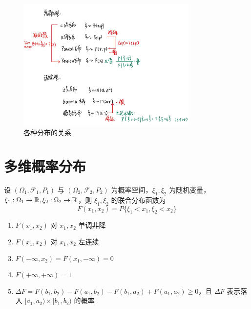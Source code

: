 \documentclass[12pt,a4paper]{amsart}
\begin{document}
\begin{figure}[htbp]
    \centering
    \includegraphics[width=0.8\textwidth]{./src/1.png}
    \caption{各种分布的关系}
    \label{fig:1}
\end{figure}

\section{多维概率分布}

\begin{definition}[联合分布函数]
    设 $(\Omega_1, \mathcal{F}_1, P_1)$ 与 $(\Omega_2, \mathcal{F}_2, P_2)$ 为概率空间，$\xi_1, \xi_2$ 为随机变量，$\xi_1: \Omega_1\to\mathbb{R}, \xi_2: \Omega_2\to\mathbb{R}$，则 $\xi_1, \xi_2$ 的联合分布函数为
    \begin{equation}
        F(x_1, x_2) = P\{\xi_1 < x_1, \xi_2 < x_2\}
    \end{equation}
\end{definition}

\begin{proposition}[联合分布函数的性质]
    \begin{enumerate}
        \item $F(x_1, x_2)$ 对 $x_1, x_2$ 单调非降
        \item $F(x_1, x_2)$ 对 $x_1, x_2$ 左连续
        \item $F(-\infty, x_2) = F(x_1, -\infty) = 0$
        \item $F(+\infty, +\infty) = 1$
        \item $\Delta F = F(b_1, b_2) - F(a_1, b_2) - F(b_1, a_2) + F(a_1, a_2) \geq 0$，且 $\Delta F$ 表示落入 $[a_1, a_2)\times[b_1, b_2)$ 的概率
    \end{enumerate}
\end{proposition}
\end{document}
